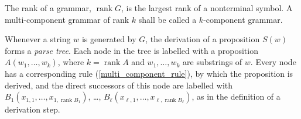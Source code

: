 \documentclass[runningheads]{llncs}
\newcommand{\ranksymb}{\mathop{\mathrm{rank}}}
\newcommand{\rank}[1]{\ranksymb #1}
\begin{document}
\begin{definition}
The rank of a grammar, $\rank{G}$, is the largest rank of a nonterminal symbol.
A multi-component grammar of rank $k$
shall be called a $k$-component grammar.
\end{definition}

Whenever a string $w$ is generated by $G$,
the derivation of a proposition $S(w)$
forms a \emph{parse tree}.
Each node in the tree is labelled with a proposition $A(w_1, \ldots, w_k)$,
where $k=\rank{A}$ and $w_1, \ldots, w_k$ are substrings of $w$.
Every node has a corresponding rule (\ref{multi_component_rule}),
by which the proposition is derived,
and the direct successors of this node
are labelled with $B_1(x_{1,1}, \ldots, x_{1, \rank{B_1}})$,
	\ldots,
$B_\ell(x_{\ell,1}, \ldots, x_{\ell, \rank{B_\ell}})$,
as in the definition of a derivation step.

\end{document}
